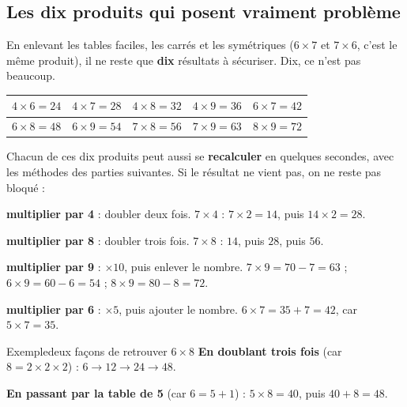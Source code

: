 \subsection{Les dix produits qui posent vraiment problème}

\begin{aretenir}
En enlevant les tables faciles, les carrés et les symétriques ($6 \times 7$ et
$7 \times 6$, c'est le même produit), il ne reste que \textbf{dix} résultats à
sécuriser. Dix, ce n'est pas beaucoup.

\begin{center}
\renewcommand{\arraystretch}{1.5}
\begin{tabular}{|c|c|c|c|c|}
\hline
\rowcolor{difficile}
$4 \times 6 = 24$ & $4 \times 7 = 28$ & $4 \times 8 = 32$ & $4 \times 9 = 36$ & $6 \times 7 = 42$ \\
\hline
\rowcolor{difficile}
$6 \times 8 = 48$ & $6 \times 9 = 54$ & $7 \times 8 = 56$ & $7 \times 9 = 63$ & $8 \times 9 = 72$ \\
\hline
\end{tabular}
\end{center}
\end{aretenir}

\begin{astuce}
Chacun de ces dix produits peut aussi se \textbf{recalculer} en quelques secondes, avec
les méthodes des parties suivantes. Si le résultat ne vient pas, on ne reste pas
bloqué :

\begin{compactitem}
\item \textbf{multiplier par 4} : doubler deux fois. $7 \times 4$ :
      $7 \times 2 = 14$, puis $14 \times 2 = 28$.
\item \textbf{multiplier par 8} : doubler trois fois. $7 \times 8$ :
      $14$, puis $28$, puis $56$.
\item \textbf{multiplier par 9} : $\times 10$, puis enlever le nombre.
      $7 \times 9 = 70 - 7 = 63$ ; $6 \times 9 = 60 - 6 = 54$ ; $8 \times 9 = 80 - 8 = 72$.
\item \textbf{multiplier par 6} : $\times 5$, puis ajouter le nombre.
      $6 \times 7 = 35 + 7 = 42$, car $5 \times 7 = 35$.
\end{compactitem}
\end{astuce}

\begin{exemple}{Exemple}{deux façons de retrouver $6 \times 8$}
\textbf{En doublant trois fois} (car $8 = 2 \times 2 \times 2$) :
$6 \rightarrow 12 \rightarrow 24 \rightarrow 48$.

\textbf{En passant par la table de 5} (car $6 = 5 + 1$) :
$5 \times 8 = 40$, puis $40 + 8 = 48$.
\end{exemple}

